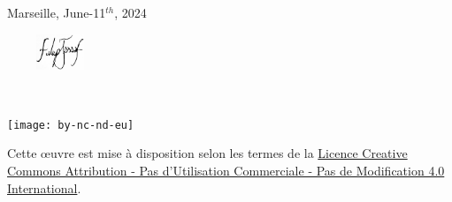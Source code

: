     Marseille, June-11$^{th}$, 2024
    
    \begin{flushright}\includegraphics[width=120px,height=40px]{tex_open/support/corrected}\end{flushright} %
\fi

~\vfill
\begin{center}
	\begin{minipage}[c]{0.25\linewidth}
		\texttt{[image: by-nc-nd-eu]}
	\end{minipage}\hfill
\end{center}

Cette \oe{}uvre est mise à disposition selon les termes de la \href{https://creativecommons.org/licenses/by-nc-nd/4.0/deed.fr}{Licence Creative Commons Attribution - Pas d’Utilisation Commerciale - Pas de Modification 4.0 International}. %
